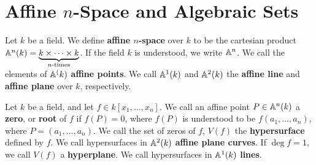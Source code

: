 \section{Affine $n$-Space and Algebraic Sets}

\begin{definition}
    Let $k$ be a field. We define  \textbf{affine $n$-space} over $k$ to be the
    cartesian product  $\mathbb{A}^n(k) = \underbrace{k \times \dots \times
    k}_{n\text{-times}}$. If the field $k$ is understood, we write  $\mathbb{A}^n$. We
    call the elements of  $\mathbb{A}^(k)$ \textbf{affine points}. We call $\mathbb{A}^1(k)$ and
    $\mathbb{A}^2(k)$ the \textbf{affine line} and \textbf{affine plane} over $k$,
    respectively.
\end{definition}

\begin{definition}
    Let $k$ be a field, and let  $f \in k[x_1, \dots, x_n]$. We call an affine
    point $P \in \mathbb{A}^n(k)$ a \textbf{zero}, or \textbf{root} of $f$ if $f(P)=0$,
    where $f(P)$ is understood to be $f(a_1, \dots, a_n)$, where $P=(a_1, \dots,
    a_n)$. We call the set of zeros of $f$, $V(f)$ the \textbf{hypersurface}
    defined by $f$. We call hypersurfaces in  $\mathbb{A}^2(k)$ \textbf{affine plane
    curves}. If $\deg{f}=1$, we call $V(f)$ a \textbf{hyperplane}. We call
    hypersurfaces in $\mathbb{A}^1(k)$ \textbf{lines}.
\end{definition}

